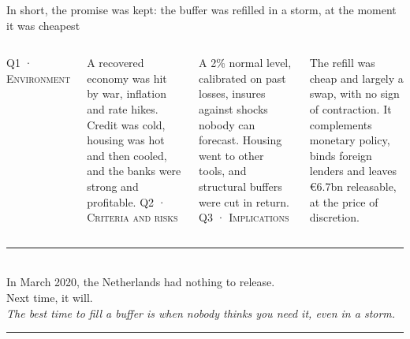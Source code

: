 \documentclass[aspectratio=169,11pt,t]{beamer}
\gdef\theqtag{}
\newcommand{\qtag}[1]{\gdef\theqtag{#1}}
\newcommand{\heading}[1]{{\color{navy}\textsc{#1}}\par\vspace{2pt}}
\begin{document}
\qtag{Conclusion}
\begin{frame}{In short, the promise was kept: the buffer was refilled in a storm, at the moment it was cheapest}
  \begin{columns}[T,onlytextwidth]
    \heading{Q1 · Environment}
    \footnotesize A recovered economy was hit by war, inflation and rate hikes. Credit was cold, housing was hot and then cooled, and the banks were strong and profitable.
    \heading{Q2 · Criteria and risks}
    \footnotesize A 2\% normal level, calibrated on past losses, insures against shocks nobody can forecast. Housing went to other tools, and structural buffers were cut in return.
    \heading{Q3 · Implications}
    \footnotesize The refill was cheap and largely a swap, with no sign of contraction. It complements monetary policy, binds foreign lenders and leaves €6.7bn releasable, at the price of discretion.
  \end{columns}
  \vspace{22pt}
  \begin{center}
    {\color{black!25}\rule{0.55\textwidth}{0.3pt}}\\[12pt]
    {\Large\color{navy} In March 2020, the Netherlands had nothing to release.\\[4pt] Next time, it will.}\\[12pt]
    {\itshape The best time to fill a buffer is when nobody thinks you need it, even in a storm.}\\[10pt]
    {\color{black!25}\rule{0.55\textwidth}{0.3pt}}
  \end{center}
\end{frame}
\end{document}
